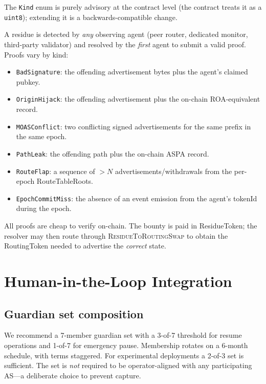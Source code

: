 \documentclass[11pt,twocolumn]{article}
\theoremstyle{definition}
\theoremstyle{plain}
\theoremstyle{remark}
\newcommand{\contractname}[1]{\textsc{#1}}
\newcommand{\code}[1]{\texttt{#1}}
\begin{document}
The \code{Kind} enum is purely advisory at the contract level (the contract treats it as a \code{uint8}); extending it is a backwards-compatible change.

A residue is detected by \emph{any} observing agent (peer router, dedicated monitor, third-party validator) and resolved by the \emph{first} agent to submit a valid proof. Proofs vary by kind:

\begin{itemize}[leftmargin=*,itemsep=2pt]
  \item \code{BadSignature}: the offending advertisement bytes plus the agent's claimed pubkey.
  \item \code{OriginHijack}: the offending advertisement plus the on-chain ROA-equivalent record.
  \item \code{MOASConflict}: two conflicting signed advertisements for the same prefix in the same epoch.
  \item \code{PathLeak}: the offending path plus the on-chain ASPA record.
  \item \code{RouteFlap}: a sequence of $>N$ advertisements/withdrawals from the per-epoch RouteTableRoots.
  \item \code{EpochCommitMiss}: the absence of an event emission from the agent's tokenId during the epoch.
\end{itemize}

All proofs are cheap to verify on-chain. The bounty is paid in ResidueToken; the resolver may then route through \contractname{ResidueToRoutingSwap} to obtain the RoutingToken needed to advertise the \emph{correct} state.

\section{Human-in-the-Loop Integration}\label{sec:hitl}

\subsection{Guardian set composition}

We recommend a 7-member guardian set with a 3-of-7 threshold for resume operations and 1-of-7 for emergency pause. Membership rotates on a 6-month schedule, with terms staggered. For experimental deployments a 2-of-3 set is sufficient. The set is \emph{not} required to be operator-aligned with any participating AS---a deliberate choice to prevent capture.
\end{document}
